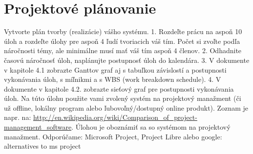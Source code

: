 
\section{Projektové plánovanie}
Vytvorte plán tvorby (realizácie) vášho systému.
1. Rozdeľte prácu na aspoň 10 úloh a rozdeľte úlohy pre aspoň 4 ľudí tvoriacich váš tím. Počet si zvoľte
podľa náročnosti témy, ale minimálne musí mať váš tím aspoň 4 členov.
2. Odhadnite časovú náročnosť úloh, naplánujte postupnosť úloh do kalendára.
3. V dokumente v kapitole 4.1 zobrazte Ganttov graf aj s tabuľkou závislostí a postupnosti vykonávania
úloh, s míľnikmi a s WBS (work breakdown schedule).
4. V dokumente v kapitole 4.2. zobrazte sieťový graf pre postupnosti vykonávania úloh.
Na túto úlohu použite vami zvolený systém na projektový manažment (či už offline, lokálny program
alebo ľubovoľný/dostupný online produkt). Zoznam je napr. na:
\url{http://en.wikipedia.org/wiki/Comparison_of_project-management_software}. Úlohou je oboznámiť sa
so systémom na projektový manažment.
Odporúčame: Microsoft Project, Project Libre alebo google: alternatives to ms project






